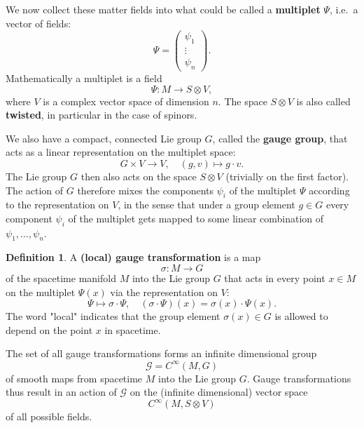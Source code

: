 \documentclass[11pt]{amsart}
\theoremstyle{definition}
\newtheorem{defn}[thm]{Definition}
\theoremstyle{remark}
\numberwithin{equation}{section}
\begin{document}
We now collect these matter fields into what could be called a  {\bf multiplet} $\Psi$, i.e.~a vector of fields:
\begin{equation*}
\Psi=\left(\begin{array}{c} \psi_1 \\ \vdots \\ \psi_n\end{array}\right).
\end{equation*} 
Mathematically a multiplet is a field
\begin{equation*}
\Psi\colon M\longrightarrow S\otimes V,
\end{equation*}
where $V$ is a complex vector space of dimension $n$. The space $S\otimes V$ is also called {\bf twisted}, in particular in the case of spinors.

We also have a compact, connected Lie group $G$, called the {\bf gauge group}, that acts as a linear representation on the multiplet space:
\begin{equation*}
G\times V\longrightarrow V,\quad(g,v)\longmapsto g\cdot v.
\end{equation*} 
The Lie group $G$ then also acts on the space $S\otimes V$ (trivially on the first factor). The action of $G$ therefore mixes the components $\psi_i$ of the multiplet $\Psi$ according to the representation on $V$, in the sense that under a group element $g\in G$ every component $\psi_i$ of the multiplet gets mapped to some linear combination of $\psi_1,\ldots,\psi_n$. 
\begin{defn}
A {\bf (local) gauge transformation} is a map 
\begin{equation*}
\sigma\colon M\longrightarrow G
\end{equation*} 
of the spacetime manifold $M$ into the Lie group $G$ that acts in every point $x\in M$ on the multiplet $\Psi(x)$ via the representation on $V$: 
\begin{equation*}
\Psi\longmapsto \sigma\cdot\Psi,\quad (\sigma\cdot\Psi)(x)=\sigma(x)\cdot\Psi(x).
\end{equation*}
The word "{}local"{} indicates that the group element $\sigma(x)\in G$ is allowed to depend on the point $x$ in spacetime.
\end{defn}
The set of all gauge transformations forms an infinite dimensional group 
\begin{equation*}
\mathcal{G}=C^\infty(M,G)
\end{equation*}
of smooth maps from spacetime $M$ into the Lie group $G$. Gauge transformations thus result in an action of $\mathcal{G}$ on the (infinite dimensional) vector space
\begin{equation*}
C^\infty(M,S\otimes V)
\end{equation*}
of all possible fields.
\end{document}
